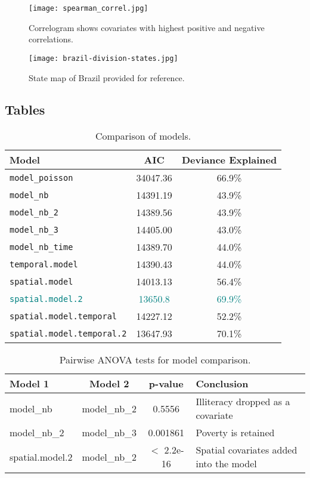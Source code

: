 
\begin{figure}[H]
\centering
\texttt{[image: spearman\_correl.jpg]}
\caption{\label{fig:spearman_correl}Correlogram shows covariates with highest positive and negative correlations.}
\end{figure}

\begin{figure}[H]
\centering
\texttt{[image: brazil-division-states.jpg]}
\caption{\label{fig:brazil-division-states}State map of Brazil provided for reference.}
\end{figure}


\subsection{Tables}

\begin{table}[H]
\centering
\begin{tabular}{l|c|c}
Model & AIC & Deviance Explained\\\hline
\texttt{model\_poisson} & 34047.36 & 66.9\%\\
\texttt{model\_nb} & 14391.19 & 43.9\%\\
\texttt{model\_nb\_2} & 14389.56 & 43.9\%\\
\texttt{model\_nb\_3} & 14405.00 & 43.0\%\\
\texttt{model\_nb\_time} & 14389.70 & 44.0\%\\
\texttt{temporal.model} & 14390.43 & 44.0\%\\
\texttt{spatial.model} & 14013.13 & 56.4\%\\
\textcolor{teal}{\texttt{spatial.model.2}} & \textcolor{teal}{13650.8} & \textcolor{teal}{69.9\%}\\
\texttt{spatial.model.temporal} & 14227.12 & 52.2\%\\
\texttt{spatial.model.temporal.2} & 13647.93 & 70.1\%
\end{tabular}
\caption{\label{tab:metrics}Comparison of models.}
\end{table}


\begin{table}[H]
\centering
\begin{tabular}{l|c|c|l}
Model 1 & Model 2 & p-value & Conclusion \\\hline
model\_nb & model\_nb\_2 & 0.5556 & Illiteracy dropped as a covariate\\
model\_nb\_2 & model\_nb\_3 & 0.001861 & Poverty is retained\\
spatial.model.2 & model\_nb\_2 & $<$ 2.2e-16 & Spatial covariates added into the model
\end{tabular}
\caption{\label{tab:ANOVA}Pairwise ANOVA tests for model comparison.}
\end{table}


